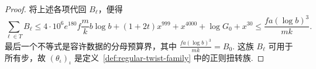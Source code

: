 \begin{proof}
将上述各项代回 $B_\ell$，便得
\[
 \sum_{\ell\in T} B_\ell
 \le 4\cdot10^6 e^{180} f\frac{m}{k}b\log b
 +(1+2t)x^{999}+x^{4000}+\log G_0+x^{30}
 \le \frac{fa(\log b)^3}{mk}.
\]
最后一个不等式是容许数据的分母预算界，其中 $\frac{fa(\log b)^3}{mk}=B_0$. 这族 $B_\ell$ 可用于所有步，故 $(\theta_\iota)_\iota$ 是定义~\ref{def:regular-twist-family} 中的正则扭转族.
\end{proof}
